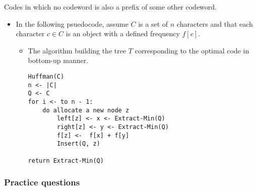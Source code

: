 \documentclass[a4paper,11pt]{article}
\begin{document}
\begin{description}
\itemsep1pt\parskip0pt
\item[Prefix codes]
Codes in which no codeword is also a prefix of some other codeword.
\end{description}

\begin{itemize}
\itemsep1pt\parskip0pt
\item
  In the following psuedocode, assume $C$ is a set of $n$ characters and
  that each character $c \in C$ is an object with a defined frequency
  $f[c]$.

  \begin{itemize}
  \item
    The algorithm building the tree $T$ corresponding to the optimal
    code in bottom-up manner.

\begin{verbatim}
Huffman(C)
n <- |C|
Q <- C
for i <- to n - 1:
    do allocate a new node z
        left[z] <- x <- Extract-Min(Q)
        right[z] <- y <- Extract-Min(Q)  
        f[z] <-  f[x] + f[y]
        Insert(Q, z)

return Extract-Min(Q)
\end{verbatim}
  \end{itemize}
\end{itemize}

\subsubsection{Practice questions}\label{practice-questions-9}
\end{document}
